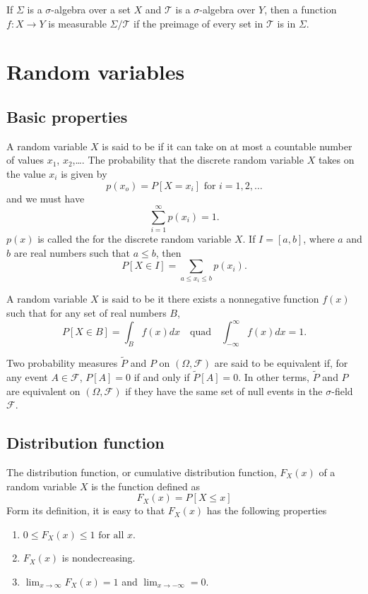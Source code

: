 If $\Sigma$ is a $\sigma$-algebra over a set $X$ and $\mathcal{T}$ is a $\sigma$-algebra over $Y$, then a function $f: X \rightarrow Y$ is measurable $\Sigma/\mathcal{T}$ if the preimage of every set in $\mathcal{T}$ is in $\Sigma$.

\section{Random variables}

\subsection{Basic properties}

A random variable $X$ is said to be  if it can take on
at most a countable number of values $x_1$, $x_2$,\ldots.
The probability that the discrete random variable $X$ takes on the
value $x_i$ is given by
\[
p(x_o) = P[X=x_i] \mbox{ for } i = 1,2,\ldots
\]
and we must have
\[
\sum_{i = 1}^{\infty} p(x_i) = 1.
\]
$p(x)$ is called the  for the
discrete random variable $X$.
If $I = [a,b]$, where $a$ and $b$ are real numbers such that $a \leq
b$, then
\[
P[X \in I] = \sum_{a \leq x_i \leq b} p(x_i).
\]

A random variable $X$ is said to be  it there exists
a nonnegative function $f(x)$ such that for any set of real numbers
$B$,
\[
P[X \in B] = \int_B f(x)dx \quad \mbox{quad} \quad
\int_{-\infty}^{\infty} f(x)dx = 1.
\]

Two probability measures $\tilde{P}$ and $P$ on $(\Omega,
\mathcal{F})$ are said to be equivalent if, for any event $A \in
\mathcal{F}$, $P[A] = 0$ if and only if $\tilde{P}[A] = 0$.
In other terms, $\tilde{P}$ and $P$ are equivalent on $(\Omega,
\mathcal{F})$ if they have the same set of null events in the
$\sigma$-field $\mathcal{F}$.

\subsection{Distribution function}

The distribution function, or cumulative distribution function, $F_X(x)$ of a random variable $X$ is the function defined as
\[
F_X(x) = P[X \leq x]
\]
Form its definition, it is easy to that $F_X(x)$ has the following properties
\begin{enumerate}
	\item
	$0 \leq F_X(x) \leq 1 \mbox{ for all } x$.
	\item
	$F_X(x)$ is nondecreasing.
	\item
	$\lim_{x\rightarrow\infty} F_X(x) = 1$ and $\lim_{x \rightarrow -\infty}
	= 0$.
\end{enumerate}

